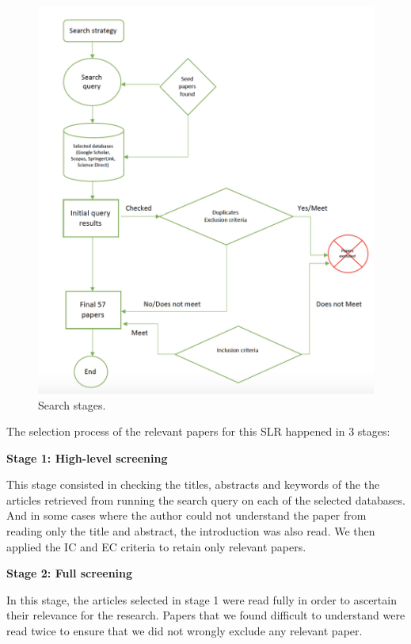 \documentclass{article}
\begin{document}
\begin{multicols}{2}
\begin{figure}[htbp]
 \centerline{\includegraphics[scale=0.40]{searchstrategy1.png}}
  \caption{Search stages.}
  \label{fig}
\end{figure}

The selection process of the relevant papers for this SLR happened in 3 stages:

\textbf{Stage 1: High-level screening}

This stage consisted in checking the titles, abstracts and keywords of the the articles retrieved from running the search query on each of the selected databases.  And in some cases where the author could not understand the paper from reading only the title and abstract, the introduction was also read. We then applied the IC and EC criteria to retain only relevant papers.

\textbf{Stage 2: Full screening}

In this stage, the articles selected in stage 1 were read fully in order to ascertain their relevance for the research. Papers that we found difficult to understand were read twice to ensure that we did not wrongly exclude any relevant paper.


\end{multicols}
\end{document}
